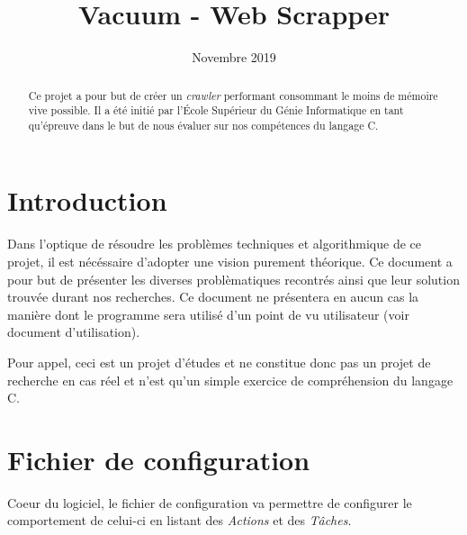\documentclass[conference]{IEEEtran}
\begin{document}
\title{Vacuum - Web Scrapper\\}

\author{
\and
{}
}
\date{Novembre 2019}

\maketitle

\begin{abstract}
Ce projet a pour but de créer un \textit{crawler} performant consommant le moins de mémoire vive possible. Il a été initié par l'École Supérieur du Génie Informatique en tant qu'épreuve dans le but de nous évaluer sur nos compétences du langage C.
\end{abstract}

\section{Introduction}

Dans l'optique de résoudre les problèmes techniques et algorithmique de ce projet, il est nécéssaire d'adopter une vision purement théorique.
Ce document a pour but de présenter les diverses problèmatiques recontrés ainsi que leur solution trouvée durant nos recherches. Ce document ne présentera en aucun cas la manière dont le programme sera utilisé d'un point de vu utilisateur (voir document d'utilisation).

Pour appel, ceci est un projet d'études et ne constitue donc pas un projet de recherche en cas réel et n'est qu'un simple exercice de compréhension du langage C.

\section{Fichier de configuration}

Coeur du logiciel, le fichier de configuration va permettre de configurer le comportement de celui-ci en listant des \textit{Actions} et des \textit{Tâches}.
\end{document}

